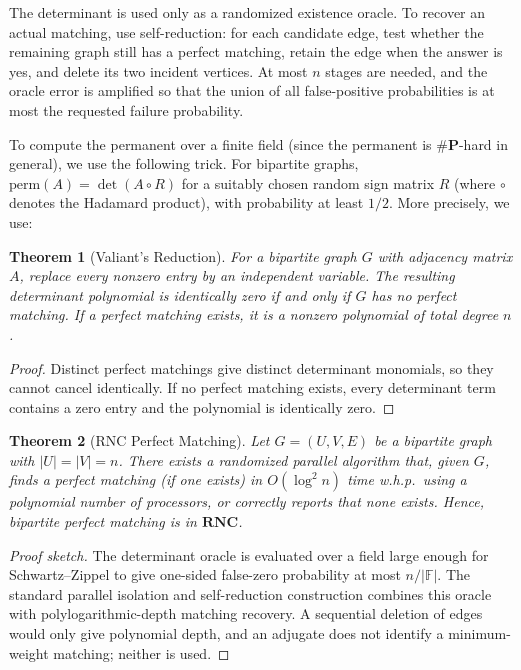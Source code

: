 \documentclass[twoside,12pt]{book}
\theoremstyle{plain}
\newtheorem{theorem}{Theorem}[chapter]
\theoremstyle{definition}
\theoremstyle{remark}
\begin{document}
The determinant is used only as a randomized existence oracle. To recover an
actual matching, use self-reduction: for each candidate edge, test whether the
remaining graph still has a perfect matching, retain the edge when the answer
is yes, and delete its two incident vertices. At most $n$ stages are needed,
and the oracle error is amplified so that the union of all false-positive
probabilities is at most the requested failure probability.

To compute the permanent over a finite field (since the permanent is $\#\mathbf{P}$-hard in general), we use the following trick. For bipartite graphs, $\text{perm}(A) = \det(A \circ R)$ for a suitably chosen random sign matrix $R$ (where $\circ$ denotes the Hadamard product), with probability at least $1/2$. More precisely, we use:

\begin{theorem}[Valiant's Reduction]
\label{thm:valiant-bis}
For a bipartite graph $G$ with adjacency matrix $A$, replace every nonzero
entry by an independent variable. The resulting determinant polynomial is
identically zero if and only if $G$ has no perfect matching. If a perfect
matching exists, it is a nonzero polynomial of total degree $n$.
\end{theorem}

\begin{proof}
Distinct perfect matchings give distinct determinant monomials, so they cannot
cancel identically. If no perfect matching exists, every determinant term
contains a zero entry and the polynomial is identically zero.
\end{proof}

\begin{theorem}[RNC Perfect Matching]
\label{thm:rnc-pm}
Let $G = (U, V, E)$ be a bipartite graph with $|U| = |V| = n$. There exists a randomized parallel algorithm that, given $G$, finds a perfect matching (if one exists) in $O(\log^2 n)$ time w.h.p.\ using a polynomial number of processors, or correctly reports that none exists. Hence, bipartite perfect matching is in $\mathbf{RNC}$.
\end{theorem}

\begin{proof}[Proof sketch]
The determinant oracle is evaluated over a field large enough for
Schwartz--Zippel to give one-sided false-zero probability at most
$n/|\mathbb F|$. The standard parallel isolation and self-reduction
construction combines this oracle with polylogarithmic-depth matching
recovery. A sequential deletion of edges would only give polynomial depth,
and an adjugate does not identify a minimum-weight matching; neither is used.
\end{proof}
\end{document}
